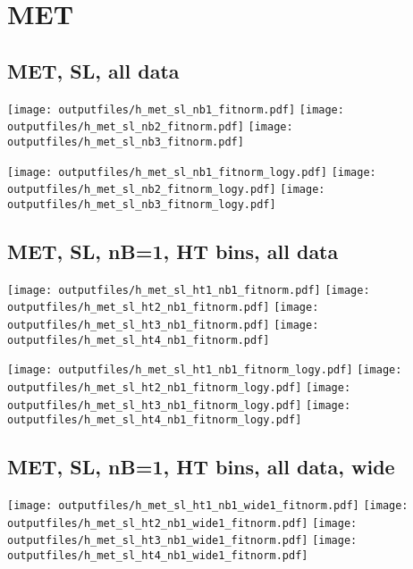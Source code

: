 \documentclass[11pt]{article}
\begin{document}
    \section{MET}
     \subsection{ MET, SL, all data}

    \noindent
     \texttt{[image: outputfiles/h\_met\_sl\_nb1\_fitnorm.pdf]}
     \texttt{[image: outputfiles/h\_met\_sl\_nb2\_fitnorm.pdf]}
     \texttt{[image: outputfiles/h\_met\_sl\_nb3\_fitnorm.pdf]}

    \noindent
     \texttt{[image: outputfiles/h\_met\_sl\_nb1\_fitnorm\_logy.pdf]}
     \texttt{[image: outputfiles/h\_met\_sl\_nb2\_fitnorm\_logy.pdf]}
     \texttt{[image: outputfiles/h\_met\_sl\_nb3\_fitnorm\_logy.pdf]}


     \subsection{ MET, SL, nB=1, HT bins, all data}


    \noindent
     \texttt{[image: outputfiles/h\_met\_sl\_ht1\_nb1\_fitnorm.pdf]}
     \texttt{[image: outputfiles/h\_met\_sl\_ht2\_nb1\_fitnorm.pdf]}
     \texttt{[image: outputfiles/h\_met\_sl\_ht3\_nb1\_fitnorm.pdf]}
     \texttt{[image: outputfiles/h\_met\_sl\_ht4\_nb1\_fitnorm.pdf]}

    \noindent
     \texttt{[image: outputfiles/h\_met\_sl\_ht1\_nb1\_fitnorm\_logy.pdf]}
     \texttt{[image: outputfiles/h\_met\_sl\_ht2\_nb1\_fitnorm\_logy.pdf]}
     \texttt{[image: outputfiles/h\_met\_sl\_ht3\_nb1\_fitnorm\_logy.pdf]}
     \texttt{[image: outputfiles/h\_met\_sl\_ht4\_nb1\_fitnorm\_logy.pdf]}



     \clearpage
     \subsection{ MET, SL, nB=1, HT bins, all data, wide}

    \noindent
     \texttt{[image: outputfiles/h\_met\_sl\_ht1\_nb1\_wide1\_fitnorm.pdf]}
     \texttt{[image: outputfiles/h\_met\_sl\_ht2\_nb1\_wide1\_fitnorm.pdf]}
     \texttt{[image: outputfiles/h\_met\_sl\_ht3\_nb1\_wide1\_fitnorm.pdf]}
     \texttt{[image: outputfiles/h\_met\_sl\_ht4\_nb1\_wide1\_fitnorm.pdf]}
\end{document}
